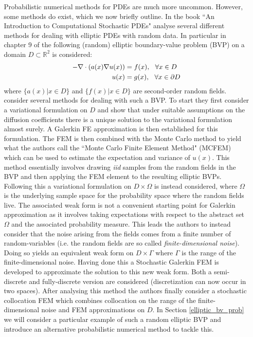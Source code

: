 Probabilistic numerical methods for PDEs are much more uncommon. However, some methods do exist, which we now briefly outline. In the book ``An Introduction to Computational Stochastic PDEs" \textcolor{blue}{\citeauthor{lord2014introduction}} analyse several different methods for dealing with elliptic PDEs with random data. In particular in chapter 9 of \textcolor{blue}{\cite{lord2014introduction}} the following (random) elliptic boundary-value problem (BVP) on a domain $D\subset\mathbb{R}^2$ is considered:
\begin{align*}
-\nabla \cdot(a(x) \nabla u(x)) &=f(x), \hspace{0.25cm} \forall x \in D \\
u(x) &=g(x), \hspace{0.25cm} \forall x \in \partial D
\end{align*}
where $\{a(x)|x\in D\}$ and $\{f(x)|x\in D\}$ are second-order random fields. \textcolor{blue}{\citeauthor{lord2014introduction}} consider several methods for dealing with such a BVP. To start they first consider a variational formulation on $D$ and show that under suitable assumptions on the diffusion coefficients there is a unique solution to the variational formulation almost surely. A Galerkin FE approximation is then established for this formulation.
The FEM is then combined with the Monte Carlo method to yield what the authors call the ``Monte Carlo Finite Element Method" (MCFEM) which can be used to estimate the expectation and variance of $u(x)$. This method essentially involves drawing \textit{iid} samples from the random fields in the BVP and then applying the FEM element to the resulting elliptic BVPs. Following this a variational formulation on $D\times\Omega$ is instead considered, where $\Omega$ is the underlying sample space for the probability space where the random fields live. The associated weak form is not a convenient starting point for Galerkin approximation as it involves taking expectations with respect to the abstract set $\Omega$ and the associated probability measure.
This leads the authors to instead consider that the noise arising from the fields comes from a finite number of random-variables (i.e. the random fields are so called \textit{finite-dimensional noise}). Doing so yields an equivalent weak form on $D\times\Gamma$ where $\Gamma$ is the range of the finite-dimensional noise. Having done this a Stochastic Galerkin FEM is developed to approximate the solution to this new weak form. Both a semi-discrete and fully-discrete version are considered (discretization can now occur in two spaces). After analysing this method the authors finally consider a stochastic collocation FEM which combines collocation on the range of the finite-dimensional noise and FEM approximations on $D$. In Section \textcolor{blue}{\ref{elliptic_bv_prob}} we will consider a particular example of such a random elliptic BVP and introduce an alternative probabilistic numerical method to tackle this.


\clearpage

